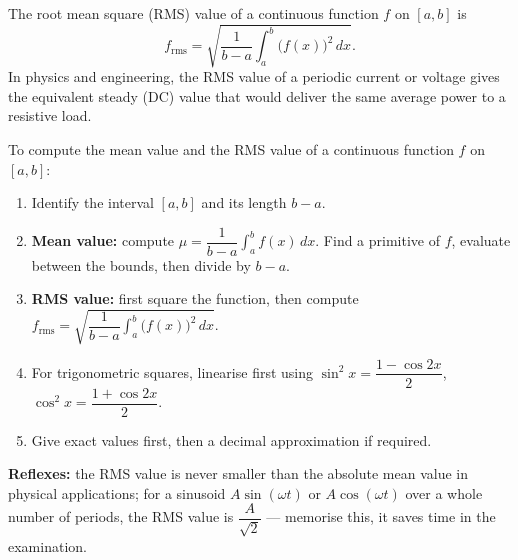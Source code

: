 \documentclass[11pt]{article}
\newcommand{\cle}[1]{{\popxbold\color{popdark}#1}}
\begin{document}
\begin{definition}
The \cle{root mean square (RMS) value} of a continuous function $f$ on $[a,b]$ is
\[
f_{\mathrm{rms}} = \sqrt{\frac{1}{b-a}\int_a^b \bigl(f(x)\bigr)^2\,dx}.
\]
In physics and engineering, the RMS value of a periodic current or voltage gives the equivalent steady (DC) value that would deliver the same average power to a resistive load.
\end{definition}

\begin{methode}
To compute the mean value and the RMS value of a continuous function $f$ on $[a,b]$:
\begin{enumerate}
\item Identify the interval $[a,b]$ and its length $b-a$.
\item \textbf{Mean value:} compute $\mu=\dfrac{1}{b-a}\displaystyle\int_a^b f(x)\,dx$. Find a primitive of $f$, evaluate between the bounds, then divide by $b-a$.
\item \textbf{RMS value:} first square the function, then compute $f_{\mathrm{rms}}=\sqrt{\dfrac{1}{b-a}\displaystyle\int_a^b \bigl(f(x)\bigr)^2\,dx}$.
\item For trigonometric squares, linearise first using $\sin^2x=\dfrac{1-\cos 2x}{2}$, $\cos^2x=\dfrac{1+\cos 2x}{2}$.
\item Give exact values first, then a decimal approximation if required.
\end{enumerate}
\textbf{Reflexes:} the RMS value is never smaller than the absolute mean value in physical applications; for a sinusoid $A\sin(\omega t)$ or $A\cos(\omega t)$ over a whole number of periods, the RMS value is $\dfrac{A}{\sqrt{2}}$ — memorise this, it saves time in the examination.
\end{methode}
\end{document}
